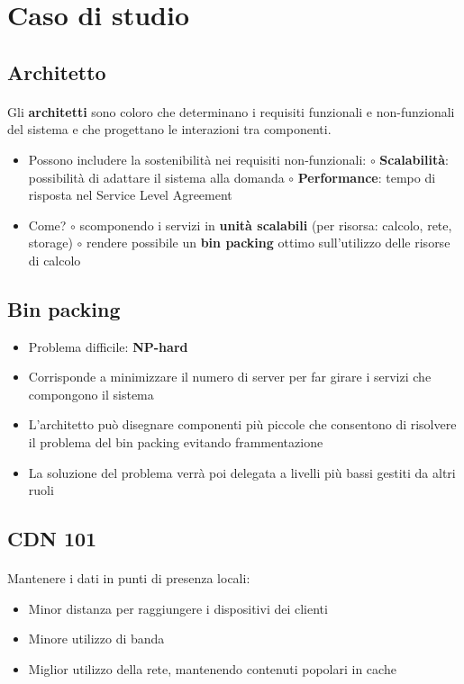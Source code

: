 \documentclass[a4paper, 12pt]{report}
\begin{document}
          \section{Caso di studio}
          \subsection{Architetto}
          \paragraph{}Gli \textbf{architetti} sono coloro che determinano i requisiti funzionali e non-funzionali del sistema e che progettano le interazioni tra componenti.
          \begin{itemize}
            \item Possono includere la sostenibilità nei requisiti non-funzionali:
            \subitem $\circ$ \textbf{Scalabilità}: possibilità di adattare il sistema alla domanda
            \subitem $\circ$ \textbf{Performance}: tempo di risposta nel Service Level Agreement
            \item Come?
            \subitem $\circ$ scomponendo i servizi in \textbf{unità scalabili} (per risorsa: calcolo, rete, storage)
            \subitem $\circ$ rendere possibile un \textbf{bin packing} ottimo sull'utilizzo delle risorse di calcolo
          \end{itemize}
          \subsection{Bin packing}
          \begin{itemize}
            \item Problema difficile: \textbf{NP-hard}
            \item Corrisponde a minimizzare il numero di server per far girare i servizi che compongono il sistema
            \item L’architetto può disegnare componenti più piccole che consentono di risolvere il problema del bin packing evitando frammentazione
            \item La soluzione del problema verrà poi delegata a livelli più bassi gestiti da altri ruoli 
          \end{itemize}
          \subsection{CDN 101}
          \paragraph{}Mantenere i dati in punti di presenza locali:
          \begin{itemize}
            \item Minor distanza per raggiungere i dispositivi dei clienti
            \item Minore utilizzo di banda
            \item Miglior utilizzo della rete, mantenendo contenuti popolari in cache
          \end{itemize}
\end{document}
